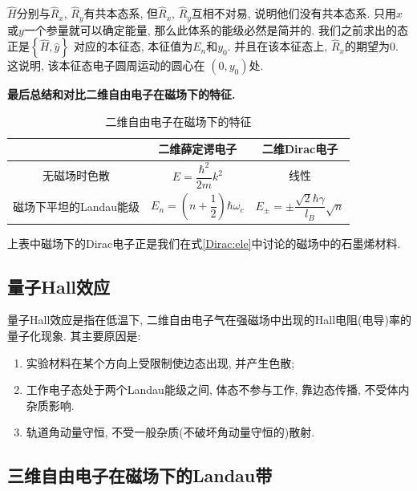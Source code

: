 \documentclass[a4paper, 11pt]{article}
\begin{document}
\begin{spacing}{1.2}
        $\hat{H}$分别与$\hat{R}_x$, $\hat{R}_y$有共本态系, 但$\hat{R}_x$, $\hat{R}_y$互相不对易, 说明他们没有共本态系.
        只用$x$或$y$一个参量就可以确定能量, 那么此体系的能级必然是简并的. 我们之前求出的态正是$\left\{\hat{H},\hat{y}\right\}$
        对应的本征态, 本征值为$E_n$和$y_0$. 并且在该本征态上, $\hat{R}_x$的期望为0. 这说明, 该本征态电子圆周运动的圆心在
        $(0,y_0)$处.

        \textbf{最后总结和对比二维自由电子在磁场下的特征.}

        \begin{table}[H]
          \centering
          \begin{spacing}{2.5}
          \caption{二维自由电子在磁场下的特征}
          \begin{tabular}{c|c|c}
            \toprule
                       & 二维薛定谔电子 & 二维Dirac电子\\ 
            \hline
            无磁场时色散 &$E=\dfrac{\hbar^2}{2m}k^2$ & 线性\\
            \hline
            磁场下平坦的Landau能级 & $E_n = \left(n+\dfrac{1}{2}\right)\hbar\omega_c$ & %
            $E_{\pm}=\pm\dfrac{\sqrt{2}\hbar\gamma}{l_B}\sqrt{n}$\\ 
            \bottomrule 
          \end{tabular} 
          \end{spacing}
        \end{table}

        上表中磁场下的Dirac电子正是我们在式\eqref{Dirac:ele}中讨论的磁场中的石墨烯材料.
        
      \subsection{量子Hall效应}
        量子Hall效应是指在低温下, 二维自由电子气在强磁场中出现的Hall电阻(电导)率的量子化现象. 
        其主要原因是:
        \begin{enumerate}[1.]
          \item 实验材料在某个方向上受限制使边态出现, 并产生色散;
          \item 工作电子态处于两个Landau能级之间, 体态不参与工作, 靠边态传播, 不受体内杂质影响.
          \item 轨道角动量守恒, 不受一般杂质(不破坏角动量守恒的)散射.
        \end{enumerate}

      \subsection{三维自由电子在磁场下的Landau带}


\end{spacing}
\end{document}
